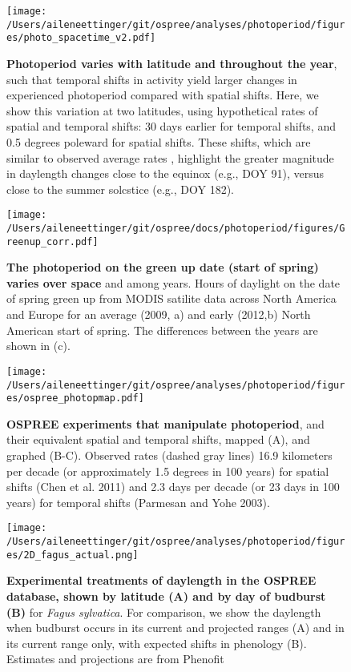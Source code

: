 \documentclass{article}
\begin{document}
\begin{figure}[p]
\centering
\texttt{[image: /Users/aileneettinger/git/ospree/analyses/photoperiod/figures/photo\_spacetime\_v2.pdf]} %
\caption{\textbf{Photoperiod varies with latitude and throughout the year}, such that temporal shifts in activity yield larger changes in experienced photoperiod compared with spatial shifts. Here, we show this variation at two latitudes, using hypothetical rates of spatial and temporal shifts: 30 days earlier for temporal shifts, and 0.5 degrees poleward for spatial shifts. These shifts, which are similar to observed average rates \citep[][e.g.,]{parmesan2006,chen2011}, highlight the greater magnitude in daylength changes close to the equinox (e.g., DOY 91), versus close to the summer solcstice (e.g., DOY 182).}
 \label{fig:spacetime}%
 \end{figure}
 
\begin{figure}[p]
\centering
\texttt{[image: /Users/aileneettinger/git/ospree/docs/photoperiod/figures/Greenup\_corr.pdf]} %
\caption{\textbf{The photoperiod on the green up date (start of spring) varies over space} and among years. Hours of daylight on the date of spring green up from MODIS satilite data across North America and Europe for an average (2009, a) and  early (2012,b) North American start of spring. The differences between the years are shown in (c). }
 \label{fig:greenup}%
 \end{figure}
\begin{figure}[p]
\centering
\texttt{[image: /Users/aileneettinger/git/ospree/analyses/photoperiod/figures/ospree\_photopmap.pdf]} 
\caption{\textbf{OSPREE experiments that manipulate photoperiod}, and their equivalent spatial and temporal shifts, mapped (A), and graphed (B-C). Observed rates (dashed gray lines) 16.9 kilometers per decade (or approximately 1.5 degrees in 100 years) for spatial shifts (Chen et al. 2011) and 2.3 days per decade (or 23 days in 100 years) for temporal shifts (Parmesan and Yohe 2003).}
 \label{fig:photomap}
 \end{figure}


 
\begin{figure}[p]
\texttt{[image: /Users/aileneettinger/git/ospree/analyses/photoperiod/figures/2D\_fagus\_actual.png]} 
\caption{\textbf{Experimental treatments of daylength in the OSPREE database, shown by latitude (A) and by day of budburst (B)} for \textit{Fagus sylvatica}. For comparison, we show the daylength when budburst occurs in its current and projected ranges (A) and in its current range only, with expected shifts in phenology (B). Estimates and projections are from Phenofit \citep{duputie2015}}
 \label{fig:fagus}
 \end{figure}
 
\end{document}

